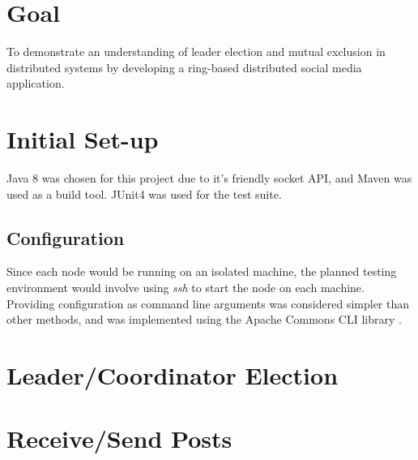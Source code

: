 \documentclass[12pt]{article}
\begin{document}
\begin{titlepage}

\vfill %

\end{titlepage}

\tableofcontents
\newpage

\setcounter{page}{1} 

\section{Goal}

To demonstrate an understanding of leader election and mutual exclusion in distributed systems by developing a ring-based distributed social media application.

\section{Initial Set-up}

Java 8 was chosen for this project due to it's friendly socket API, and Maven \cite{maven} was used as a build tool. JUnit4 was used for the test suite.

\subsection{Configuration}

Since each node would be running on an isolated machine, the planned testing environment would involve using \emph{ssh} to start the node on each machine. Providing configuration as command line arguments was considered simpler than other methods, and was implemented using the Apache Commons CLI library \cite{apachecli}. 

\section{Leader/Coordinator Election}

\section{Receive/Send Posts}



\end{document}
